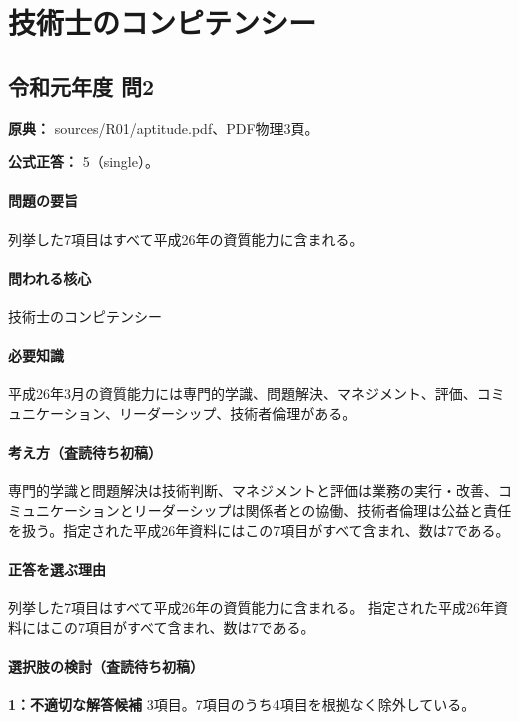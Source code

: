 \section{技術士のコンピテンシー}

\subsection{令和元年度 問2}
\label{q:r01-reg-apt-02}

\noindent\textbf{原典：} sources/R01/aptitude.pdf、PDF物理3頁。

\textbf{公式正答：} 5（single）。

\paragraph{問題の要旨} 列挙した7項目はすべて平成26年の資質能力に含まれる。

\paragraph{問われる核心} 技術士のコンピテンシー

\paragraph{必要知識} 平成26年3月の資質能力には専門的学識、問題解決、マネジメント、評価、コミュニケーション、リーダーシップ、技術者倫理がある。

\paragraph{考え方（査読待ち初稿）} 専門的学識と問題解決は技術判断、マネジメントと評価は業務の実行・改善、コミュニケーションとリーダーシップは関係者との協働、技術者倫理は公益と責任を扱う。指定された平成26年資料にはこの7項目がすべて含まれ、数は7である。

\paragraph{正答を選ぶ理由} 列挙した7項目はすべて平成26年の資質能力に含まれる。 指定された平成26年資料にはこの7項目がすべて含まれ、数は7である。

\paragraph{選択肢の検討（査読待ち初稿）}

\noindent\textbf{1：不適切な解答候補} 3項目。7項目のうち4項目を根拠なく除外している。\par


